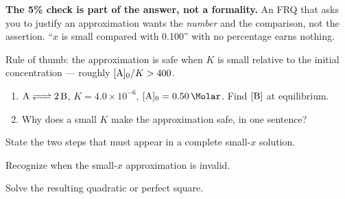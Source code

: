 \documentclass{apchem-notes}
\begin{document}
\begin{apctrap}
\textbf{The 5\% check is part of the answer, not a formality.} An FRQ that
asks you to justify an approximation wants the \emph{number} and the
comparison, not the assertion. ``$x$ is small compared with 0.100'' with no
percentage earns nothing.

Rule of thumb: the approximation is safe when $K$ is small relative to the
initial concentration --- roughly $[\ce{A}]_0/K > 400$.
\end{apctrap}


\begin{enumerate}[leftmargin=*,itemsep=0.4em]
  \item $\ce{A <=> 2B}$, $K = 4.0\times10^{-6}$,
        $[\ce{A}]_0 = \SI{0.50}{\Molar}$. Find $[\ce{B}]$ at equilibrium.
        \workspace[2.6cm]
  \item Why does a small $K$ make the approximation safe, in one sentence?
\end{enumerate}

\begin{exitticket}
State the two steps that must appear in a complete small-$x$ solution.
\end{exitticket}


\begin{objectives}
  \item Recognize when the small-$x$ approximation is invalid.
  \item Solve the resulting quadratic or perfect square.
\end{objectives}
\end{document}
